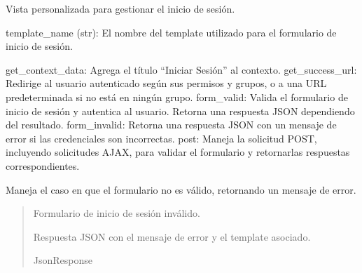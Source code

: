 \documentclass[letterpaper,10pt,spanish]{sphinxmanual}
\begin{document}
\begin{fulllineitems}

\pysigstartsignatures
{}
\pysigstopsignatures
\sphinxAtStartPar
Vista personalizada para gestionar el inicio de sesión.
\begin{description}
\sphinxAtStartPar
template\_name (str): El nombre del template utilizado para el formulario de inicio de sesión.

\sphinxAtStartPar
get\_context\_data: Agrega el título “Iniciar Sesión” al contexto.
get\_success\_url: Redirige al usuario autenticado según sus permisos y grupos, o a una URL predeterminada si no está en ningún grupo.
form\_valid: Valida el formulario de inicio de sesión y autentica al usuario. Retorna una respuesta JSON dependiendo del resultado.
form\_invalid: Retorna una respuesta JSON con un mensaje de error si las credenciales son incorrectas.
post: Maneja la solicitud POST, incluyendo solicitudes AJAX, para validar el formulario y retornarlas respuestas correspondientes.

\end{description}


\begin{fulllineitems}

\pysigstartsignatures
{}
\pysigstopsignatures
\sphinxAtStartPar
Maneja el caso en que el formulario no es válido, retornando un mensaje de error.
\begin{quote}\begin{description}
\sphinxAtStartPar
{} \textendash{} Formulario de inicio de sesión inválido.

\sphinxAtStartPar
Respuesta JSON con el mensaje de error y el template asociado.

\sphinxAtStartPar
JsonResponse

\end{description}\end{quote}

\end{fulllineitems}




\end{fulllineitems}
\end{document}
